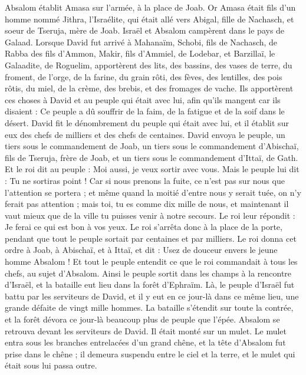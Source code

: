 \begin{multicols}{2}
Absalom établit Amasa sur l'armée, à la place de Joab. Or Amasa était fils d'un homme nommé Jithra, l'Israélite, qui était allé vers Abigal, fille de Nachasch, et soeur de Tseruja, mère de Joab.
Israël et Absalom campèrent dans le pays de Galaad.
Lorsque David fut arrivé à Mahanaïm, Schobi, fils de Nachasch, de Rabba des fils d'Ammon, Makir, fils d'Ammiel, de Lodebar, et Barzillaï, le Galaadite, de Roguelim,
apportèrent des lits, des bassins, des vases de terre, du froment, de l'orge, de la farine, du grain rôti, des fèves, des lentilles, des pois rôtis,
du miel, de la crème, des brebis, et des fromages de vache. Ils apportèrent ces choses à David et au peuple qui était avec lui, afin qu'ils mangent car ils disaient : Ce peuple a dû souffrir de la faim, de la fatigue et de la soif dans le désert.
\VerseOne{}David fit le dénombrement du peuple qui était avec lui, et il établit sur eux des chefs de milliers et des chefs de centaines.
David envoya le peuple, un tiers sous le commandement de Joab, un tiers sous le commandement d'Abischaï, fils de Tseruja, frère de Joab, et un tiers sous le commandement d'Ittaï, de Gath. Et le roi dit au peuple : Moi aussi, je veux sortir avec vous.
Mais le peuple lui dit : Tu ne sortiras point ! Car si nous prenons la fuite, ce n'est pas sur nous que l'attention se portera ; et même quand la moitié d'entre nous y serait tuée, on n'y ferait pas attention ; mais toi, tu es comme dix mille de nous, et maintenant il vaut mieux que de la ville tu puisses venir à notre secours.
Le roi leur répondit : Je ferai ce qui est bon à vos yeux. Le roi s'arrêta donc à la place de la porte, pendant que tout le peuple sortait par centaines et par milliers.
Le roi donna cet ordre à Joab, à Abischaï, et à Ittaï, et dit : Usez de douceur envers le jeune homme Absalom ! Et tout le peuple entendit ce que le roi commandait à tous les chefs, au sujet d’Absalom.
Ainsi le peuple sortit dans les champs à la rencontre d'Israël, et la bataille eut lieu dans la forêt d'Ephraïm.
Là, le peuple d'Israël fut battu par les serviteurs de David, et il y eut en ce jour-là dans ce même lieu, une grande défaite de vingt mille hommes.
La bataille s'étendit sur toute la contrée, et la forêt dévora ce jour-là beaucoup plus de peuple que l'épée.
Absalom se retrouva devant les serviteurs de David. Il était monté sur un mulet. Le mulet entra sous les branches entrelacées d'un grand chêne, et la tête d'Absalom fut prise dans le chêne ; il demeura suspendu entre le ciel et la terre, et le mulet qui était sous lui passa outre.

\end{multicols}
